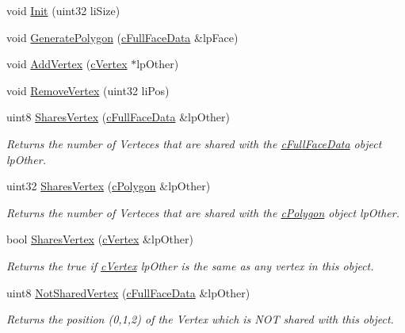 \begin{DoxyCompactItemize}
void \hyperlink{classc_polygon_ab19723e70e61e86d8384e5e96f0ac3e3}{Init} (uint32 liSize)
\item 
void \hyperlink{classc_polygon_a7f96c3fb610f648922ed0ef2a2aede43}{GeneratePolygon} (\hyperlink{classc_full_face_data}{cFullFaceData} \&lpFace)
\item 
void \hyperlink{classc_polygon_ad2bcad0ae337eba5d3ce34ba05bd34ec}{AddVertex} (\hyperlink{classc_vertex}{cVertex} $\ast$lpOther)
\item 
void \hyperlink{classc_polygon_a37fbda18b7056088f53fb72445fa40af}{RemoveVertex} (uint32 liPos)
\item 
uint8 \hyperlink{classc_polygon_a75b10057e205d8b86ad691f6ad816616}{SharesVertex} (\hyperlink{classc_full_face_data}{cFullFaceData} \&lpOther)
\begin{DoxyCompactList}\small\item\em Returns the number of Verteces that are shared with the \hyperlink{classc_full_face_data}{cFullFaceData} object lpOther. \item\end{DoxyCompactList}\item 
uint32 \hyperlink{classc_polygon_a1593da884bcb8f734c53bc92fb387291}{SharesVertex} (\hyperlink{classc_polygon}{cPolygon} \&lpOther)
\begin{DoxyCompactList}\small\item\em Returns the number of Verteces that are shared with the \hyperlink{classc_polygon}{cPolygon} object lpOther. \item\end{DoxyCompactList}\item 
bool \hyperlink{classc_polygon_a0e886ad06cb8f49ae903e5456a54be4a}{SharesVertex} (\hyperlink{classc_vertex}{cVertex} \&lpOther)
\begin{DoxyCompactList}\small\item\em Returns the true if \hyperlink{classc_vertex}{cVertex} lpOther is the same as any vertex in this object. \item\end{DoxyCompactList}\item 
uint8 \hyperlink{classc_polygon_a1a034ce510c2bbe6c9de1a4999c6efc1}{NotSharedVertex} (\hyperlink{classc_full_face_data}{cFullFaceData} \&lpOther)
\begin{DoxyCompactList}\small\item\em Returns the position (0,1,2) of the Vertex which is NOT shared with this object. \item\end{DoxyCompactList}\item 

\end{DoxyCompactItemize}
